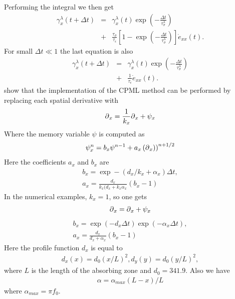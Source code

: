 \documentclass[11pt]{article}
\begin{document}
Performing the integral we then get
\begin{eqnarray*}
\gamma^{\lambda}_x(t+\Delta t) 
   & = & \gamma^{\lambda}_x (t)\exp(-\frac{\Delta t}{\tau^{\lambda}_{\sigma}}) \\
   & + & \frac{\tau_{\sigma}}{\tau_{\epsilon}}
         \left[1-\exp(-\frac{\Delta t}{\tau^{\lambda}_{\sigma}})\right]
         \dot{e}_{xx}(t).
\end{eqnarray*}
%
For small $\Delta t \ll 1$ the last equation is also
\begin{eqnarray*}
\gamma^{\lambda}_x(t+\Delta t) 
   & = & \gamma^{\lambda}_x (t)\exp(-\frac{\Delta t}{\tau^{\lambda}_{\sigma}}) \\
   & + & \frac{1}{\tau_{\epsilon}}\dot{e}_{xx}(t).
\end{eqnarray*}
\cite{Komatitsch2007} show that the implementation of the CPML method can
be performed by replacing each spatial derivative with
\begin{eqnarray*}
  \mbox{$\partial$}_x = \frac{1}{k_x}\mbox{$\partial$}_x + \psi_x
\end{eqnarray*}
Where the memory variable $\psi$ is computed as
\begin{eqnarray*}
  \psi^n_x = b_x\psi^{n-1} + a_x \left(\mbox{$\partial$}_x)\right)^{n+1/2}
\end{eqnarray*}
Here the coefficients $a_x$ and $b_x$ are
\begin{eqnarray*}
  b_x = \exp-(d_x/k_x +\alpha_x)\Delta t,\\
  a_x = \frac{d_x}{k_x(d_x + k_x\alpha_x}(b_x-1)
\end{eqnarray*}
In the numerical examples, $k_x=1$, so one gets
\begin{eqnarray*}
  \mbox{$\partial$}_x = \mbox{$\partial$}_x + \psi_x
\end{eqnarray*}
\begin{eqnarray*}
  b_x = \exp(-d_x\Delta t) \exp(-\alpha_x\Delta t),\\
  a_x = \frac{d_x}{d_x + \alpha_x}(b_x-1)
\end{eqnarray*}
Here the profile function $d_x$ is equal to
\begin{eqnarray*}
  d_x(x) = d_0(x/L)^2,
  d_y(y) = d_0(y/L)^2,
\end{eqnarray*}
where $L$ is the length of the absorbing zone and 
$d_0 = 341.9$.
Also we have
\begin{eqnarray*}
\alpha = \alpha_{max}(L-x)/L
\end{eqnarray*}
where $\alpha_{max} = \pi f_0$.
\end{document}
